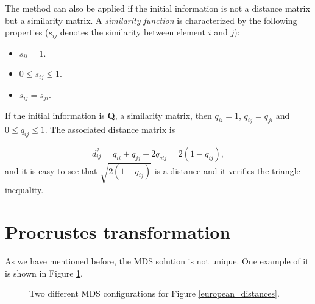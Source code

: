 \documentclass[11pt]{report}
\begin{document}
\indent The method can also be applied if the initial information is not a 
distance matrix but a similarity matrix. A \textit{similarity function} 
is characterized by the following properties ($s_{ij}$ denotes the
similarity between element $i$ and $j$):


\begin{itemize}
\item $s_{ii} = 1$.
\item $0 \leq s_{ij} \leq 1$.
\item $s_{ij} = s_{ji}$.
\end{itemize}

If the initial information is \textbf{Q}, a similarity matrix, then $q_{ii} = 1$,
$q_{ij} = q_{ji}$ and $0 \leq q_{ij} \leq 1$. The associated distance matrix 
is

\[
d_{ij}^2 = q_{ii} + q_{jj} - 2q_{qij} = 2(1-q_{ij}),
\]
and it is easy to see that $\sqrt{2(1-q_{ij})}$ is a distance and it verifies
the triangle inequality.


\section{Procrustes transformation}
As we have mentioned before, the MDS solution is not unique. One example of it 
is shown in Figure \ref{twosol}.

\begin{figure}[!ht]
    \centering
    \qquad
    \caption{Two different MDS configurations for Figure \ref{european_distances}.}%
    \label{twosol}%
\end{figure}
\end{document}
